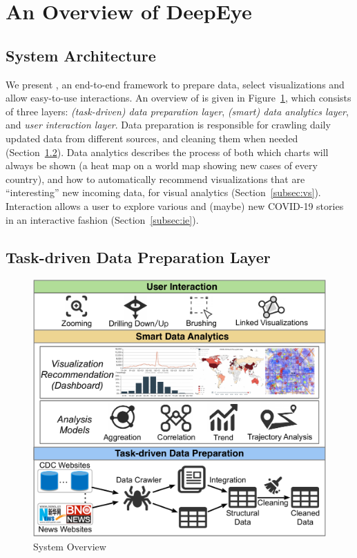 \section{An Overview of DeepEye}
\label{sec:system}

\subsection{System Architecture}

We present \sys, an end-to-end framework to prepare data, select visualizations and allow easy-to-use interactions. An overview of \sys is given in Figure~\ref{fig:framwork}, which consists of three layers: {\em (task-driven) data preparation layer}, {\em (smart) data analytics layer}, and {\em user interaction layer}.
%
%
Data preparation is responsible for crawling daily updated data from different sources, and cleaning them when needed (Section~\ref{subsec:dp}).
%
Data analytics describes the process of both which charts will always be shown (\eg a heat map on a world map showing new cases of every country), and how to automatically recommend visualizations that are ``interesting'' \wrt new incoming data, for visual analytics (Section~\ref{subsec:vs}).
%
Interaction allows a user to explore various and (maybe) new COVID-19 stories in an interactive fashion (Section~\ref{subsec:ie}).


\subsection{Task-driven Data Preparation Layer}
\label{subsec:dp}

\begin{figure}[t!]
	\centering
	\includegraphics[width=.6\columnwidth]{figs/framework.pdf}
	\caption{System Overview}
	\label{fig:framwork}
\end{figure}


